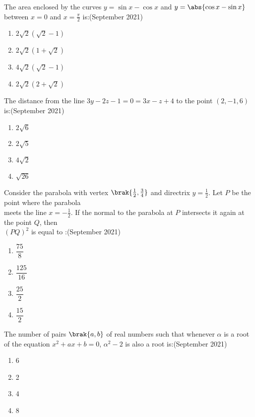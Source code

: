 \item The area enclosed by the curves $y = \sin x - \cos x$ and $y = \abs{\cos x - \sin x}$ between $x = 0$ and $x = \frac{\pi}{2}$ is:\hfill (September 2021)
\begin{multicols}{2}
\begin{enumerate}
    \item $2\sqrt{2}(\sqrt{2}-1)$\\
    \item $2\sqrt{2}(1+\sqrt{2})$
    \item $4\sqrt{2}(\sqrt{2}-1)$\\
    \item $2\sqrt{2}(2+\sqrt{2})$
\end{enumerate}
\end{multicols}
\item The distance from the line $3y - 2z - 1 = 0 = 3x - z + 4$ to the point $(2, -1, 6)$ is:\hfill (September 2021)
\begin{multicols}{2}
\begin{enumerate}
    \item $2\sqrt{6}$\\
    \item $2\sqrt{5}$
    \item $4\sqrt{2}$\\
    \item $\sqrt{26}$
\end{enumerate}
\end{multicols}

\item Consider the parabola with vertex $\brak{\frac{1}{2}, \frac{3}{4}}$ and directrix $y = \frac{1}{2}$. Let $P$ be the point where the parabola\\ meets the line $x = -\frac{1}{2}$. If the normal to the parabola at $P$ intersects it again at the point $Q$, then\\ $(PQ)^2$ is equal to :\hfill (September 2021)
\begin{multicols}{2}
    \begin{enumerate}
    \item $\dfrac{75}{8}$
    \item $\dfrac{125}{16}$
    \item $\dfrac{25}{2}$
    \item $\dfrac{15}{2}$
\end{enumerate}
\end{multicols}


\item The number of pairs $\brak{a, b}$ of real numbers such that whenever $\alpha$ is a root of the equation $x^2 + ax + b = 0$, $\alpha^2 - 2$ is also a root is:\hfill (September 2021)
\begin{multicols}{4}
\begin{enumerate}
    \item 6
    \item 2
    \item 4
    \item 8
\end{enumerate}
\end{multicols}

